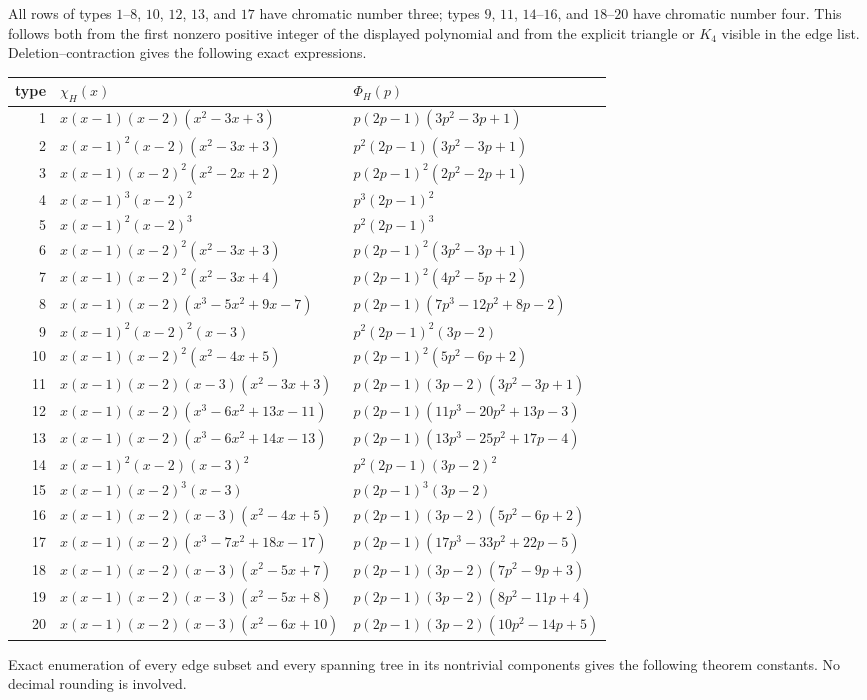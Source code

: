 \documentclass[11pt]{article}
\begin{document}
\normalsize

All rows of types $1$--$8$, $10$, $12$, $13$, and $17$ have chromatic
number three; types $9$, $11$, $14$--$16$, and $18$--$20$ have chromatic
number four.  This follows both from the first nonzero positive integer of
the displayed polynomial and from the explicit triangle or $K_4$ visible in
the edge list.  Deletion--contraction gives the following exact expressions.

\scriptsize
\begin{longtable}{r@{\quad}p{7.1cm}p{7.1cm}}
type&$\chi_H(x)$&$\Phi_H(p)$\\ \hline
1&$x(x-1)(x-2)(x^2-3x+3)$&$p(2p-1)(3p^2-3p+1)$\\
2&$x(x-1)^2(x-2)(x^2-3x+3)$&$p^2(2p-1)(3p^2-3p+1)$\\
3&$x(x-1)(x-2)^2(x^2-2x+2)$&$p(2p-1)^2(2p^2-2p+1)$\\
4&$x(x-1)^3(x-2)^2$&$p^3(2p-1)^2$\\
5&$x(x-1)^2(x-2)^3$&$p^2(2p-1)^3$\\
6&$x(x-1)(x-2)^2(x^2-3x+3)$&$p(2p-1)^2(3p^2-3p+1)$\\
7&$x(x-1)(x-2)^2(x^2-3x+4)$&$p(2p-1)^2(4p^2-5p+2)$\\
8&$x(x-1)(x-2)(x^3-5x^2+9x-7)$&$p(2p-1)(7p^3-12p^2+8p-2)$\\
9&$x(x-1)^2(x-2)^2(x-3)$&$p^2(2p-1)^2(3p-2)$\\
10&$x(x-1)(x-2)^2(x^2-4x+5)$&$p(2p-1)^2(5p^2-6p+2)$\\
11&$x(x-1)(x-2)(x-3)(x^2-3x+3)$&$p(2p-1)(3p-2)(3p^2-3p+1)$\\
12&$x(x-1)(x-2)(x^3-6x^2+13x-11)$&$p(2p-1)(11p^3-20p^2+13p-3)$\\
13&$x(x-1)(x-2)(x^3-6x^2+14x-13)$&$p(2p-1)(13p^3-25p^2+17p-4)$\\
14&$x(x-1)^2(x-2)(x-3)^2$&$p^2(2p-1)(3p-2)^2$\\
15&$x(x-1)(x-2)^3(x-3)$&$p(2p-1)^3(3p-2)$\\
16&$x(x-1)(x-2)(x-3)(x^2-4x+5)$&$p(2p-1)(3p-2)(5p^2-6p+2)$\\
17&$x(x-1)(x-2)(x^3-7x^2+18x-17)$&$p(2p-1)(17p^3-33p^2+22p-5)$\\
18&$x(x-1)(x-2)(x-3)(x^2-5x+7)$&$p(2p-1)(3p-2)(7p^2-9p+3)$\\
19&$x(x-1)(x-2)(x-3)(x^2-5x+8)$&$p(2p-1)(3p-2)(8p^2-11p+4)$\\
20&$x(x-1)(x-2)(x-3)(x^2-6x+10)$&$p(2p-1)(3p-2)(10p^2-14p+5)$
\end{longtable}
\normalsize

Exact enumeration of every edge subset and every spanning tree in its
nontrivial components gives the following theorem constants.  No decimal
rounding is involved.
\end{document}
